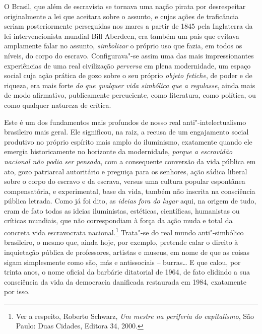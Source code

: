 O Brasil, que além de escravista se tornava uma nação pirata por
desrespeitar originalmente a lei que aceitara sobre o assunto, e cujas
ações de traficância seriam posteriormente perseguidas nos mares a
partir de 1845 pela Inglaterra da lei intervencionista mundial Bill
Aberdeen, era também um país que evitava amplamente falar no assunto,
\emph{simbolizar} o próprio uso que fazia, em todos os níveis, do corpo
do escravo. Configurava"-se assim uma das mais impressionantes
experiências de uma real civilização \emph{perversa} em plena
modernidade, um espaço social cuja ação prática de gozo sobre o seu
próprio \emph{objeto fetiche}, de poder e de riqueza, era mais forte
\emph{do que qualquer} \emph{vida simbólica que a regulasse}, ainda mais
de modo afirmativo, publicamente percuciente, como literatura, como
política, ou como qualquer natureza de crítica.

Este é um dos fundamentos mais profundos de nosso real
anti"-intelectualismo brasileiro mais geral. Ele significou, na raiz, a
recusa de um engajamento social produtivo no próprio espírito mais amplo
do iluminismo, exatamente quando ele emergia historicamente no horizonte
da modernidade, \emph{porque a escravidão nacional não podia ser
pensada}, com a consequente conversão da vida pública em ato, gozo
patriarcal autoritário e preguiça para os senhores, ação sádica liberal
sobre o corpo do escravo e da escrava, versus uma cultura popular
espontânea compensatória, e experimental, base da vida, também não
inscrita na consciência pública letrada. Como já foi dito, as
\emph{ideias fora do lugar} aqui, na origem de tudo, eram de fato todas
as ideias iluministas, estéticas, científicas, humanistas ou críticas
mundiais, que não correspondiam à força da ação muda e total da concreta
vida escravocrata nacional.\footnote{Ver a respeito, Roberto Schwarz,
  \emph{Um mestre na periferia do capitalismo}, São Paulo: Duas Cidades,
  Editora 34, 2000.} Trata"-se do real mundo anti"-simbólico brasileiro, o
mesmo que, ainda hoje, por exemplo, pretende calar o direito à
inquietação pública de professores, artistas e museus, em nome de que as
coisas sigam simplesmente como são, más e antissociais -- burras\ldots{} E
que calou, por trinta anos, o nome oficial da barbárie ditatorial de
1964, de fato elidindo a sua consciência da vida da democracia
danificada restaurada em 1984, exatamente por isso.

